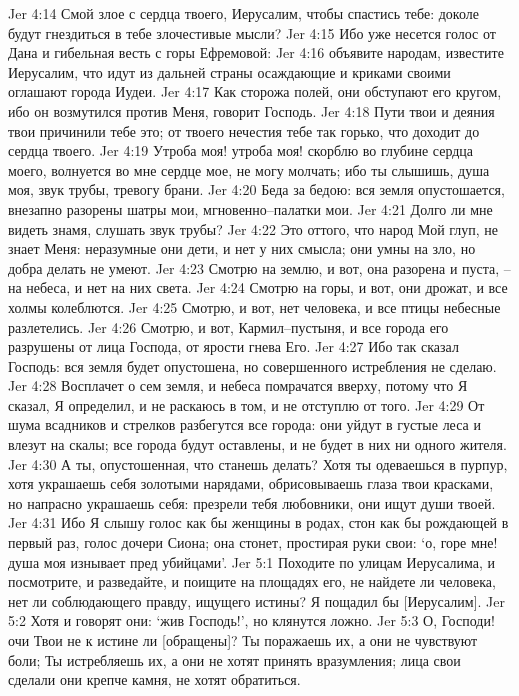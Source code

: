 Jer 4:14  Смой злое с сердца твоего, Иерусалим, чтобы спастись тебе: доколе будут гнездиться в тебе злочестивые мысли?
Jer 4:15  Ибо уже несется голос от Дана и гибельная весть с горы Ефремовой:
Jer 4:16  объявите народам, известите Иерусалим, что идут из дальней страны осаждающие и криками своими оглашают города Иудеи.
Jer 4:17  Как сторожа полей, они обступают его кругом, ибо он возмутился против Меня, говорит Господь.
Jer 4:18  Пути твои и деяния твои причинили тебе это; от твоего нечестия тебе так горько, что доходит до сердца твоего.
Jer 4:19  Утроба моя! утроба моя! скорблю во глубине сердца моего, волнуется во мне сердце мое, не могу молчать; ибо ты слышишь, душа моя, звук трубы, тревогу брани.
Jer 4:20  Беда за бедою: вся земля опустошается, внезапно разорены шатры мои, мгновенно--палатки мои.
Jer 4:21  Долго ли мне видеть знамя, слушать звук трубы?
Jer 4:22  Это оттого, что народ Мой глуп, не знает Меня: неразумные они дети, и нет у них смысла; они умны на зло, но добра делать не умеют.
Jer 4:23  Смотрю на землю, и вот, она разорена и пуста, --на небеса, и нет на них света.
Jer 4:24  Смотрю на горы, и вот, они дрожат, и все холмы колеблются.
Jer 4:25  Смотрю, и вот, нет человека, и все птицы небесные разлетелись.
Jer 4:26  Смотрю, и вот, Кармил--пустыня, и все города его разрушены от лица Господа, от ярости гнева Его.
Jer 4:27  Ибо так сказал Господь: вся земля будет опустошена, но совершенного истребления не сделаю.
Jer 4:28  Восплачет о сем земля, и небеса помрачатся вверху, потому что Я сказал, Я определил, и не раскаюсь в том, и не отступлю от того.
Jer 4:29  От шума всадников и стрелков разбегутся все города: они уйдут в густые леса и влезут на скалы; все города будут оставлены, и не будет в них ни одного жителя.
Jer 4:30  А ты, опустошенная, что станешь делать? Хотя ты одеваешься в пурпур, хотя украшаешь себя золотыми нарядами, обрисовываешь глаза твои красками, но напрасно украшаешь себя: презрели тебя любовники, они ищут души твоей.
Jer 4:31  Ибо Я слышу голос как бы женщины в родах, стон как бы рождающей в первый раз, голос дочери Сиона; она стонет, простирая руки свои: `о, горе мне! душа моя изнывает пред убийцами'.
Jer 5:1  Походите по улицам Иерусалима, и посмотрите, и разведайте, и поищите на площадях его, не найдете ли человека, нет ли соблюдающего правду, ищущего истины? Я пощадил бы [Иерусалим].
Jer 5:2  Хотя и говорят они: `жив Господь!', но клянутся ложно.
Jer 5:3  О, Господи! очи Твои не к истине ли [обращены]? Ты поражаешь их, а они не чувствуют боли; Ты истребляешь их, а они не хотят принять вразумления; лица свои сделали они крепче камня, не хотят обратиться.
